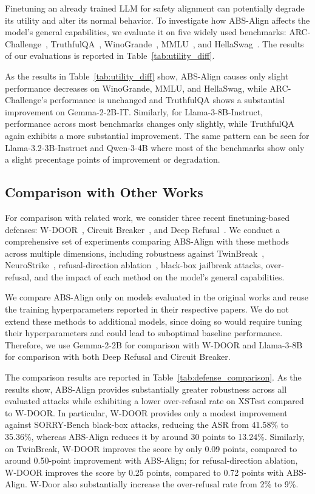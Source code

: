 Finetuning an already trained LLM for safety alignment can potentially degrade its utility and alter its normal behavior. To investigate how ABS-Align affects the model's general capabilities, we evaluate it on five widely used benchmarks: ARC-Challenge~\cite{arc_challenge}, TruthfulQA~\cite{truthfulqa}, WinoGrande~\cite{WinoGrande}, MMLU~\cite{hendrycks2021mmlu}, and HellaSwag~\cite{hellaswag}. The results of our evaluations is reported in Table~\ref{tab:utility_diff}.



As the results in Table~\ref{tab:utility_diff} show, ABS-Align causes only slight performance decreases on WinoGrande, MMLU, and HellaSwag, while ARC-Challenge's performance is unchanged and TruthfulQA shows a substantial improvement on Gemma-2-2B-IT. Similarly, for Llama-3-8B-Instruct, performance across most benchmarks changes only slightly, while TruthfulQA again exhibits a more substantial improvement. The same pattern can be seen for Llama-3.2-3B-Instruct and Qwen-3-4B where most of the benchmarks show only a slight precentage points of improvement or degradation.

\subsection{Comparison with Other Works}
\label{subsec:comparison}

For comparison with related work, we consider three recent finetuning-based defenses: W-DOOR~\cite{zhao2025door}, Circuit Breaker~\cite{zou2024circuit}, and Deep Refusal~\cite{deeprefusal}. We conduct a comprehensive set of experiments comparing ABS-Align with these methods across multiple dimensions, including robustness against TwinBreak~\cite{twinbreak}, NeuroStrike~\cite{wu2026neurostrike}, refusal-direction ablation~\cite{arditi2024refusal}, black-box jailbreak attacks, over-refusal, and the impact of each method on the model's general capabilities.

We compare ABS-Align only on models evaluated in the original works and reuse the training hyperparameters reported in their respective papers. We do not extend these methods to additional models, since doing so would require tuning their hyperparameters and could lead to suboptimal baseline performance. Therefore, we use Gemma-2-2B for comparison with W-DOOR and Llama-3-8B for comparison with both Deep Refusal and Circuit Breaker.

The comparison results are reported in Table~\ref{tab:defense_comparison}. As the results show, ABS-Align provides substantially greater robustness across all evaluated attacks while exhibiting a lower over-refusal rate on XSTest compared to W-DOOR. In particular, W-DOOR provides only a modest improvement against SORRY-Bench black-box attacks, reducing the ASR from 41.58\% to 35.36\%, whereas ABS-Align reduces it by around 30 points to 13.24\%. Similarly, on TwinBreak, W-DOOR improves the score by only 0.09 points, compared to around 0.50-point improvement with ABS-Align; for refusal-direction ablation, W-DOOR improves the score by 0.25 points, compared to 0.72 points with ABS-Align. W-Door also substantially increase the over-refusal rate from 2\% to 9\%.

